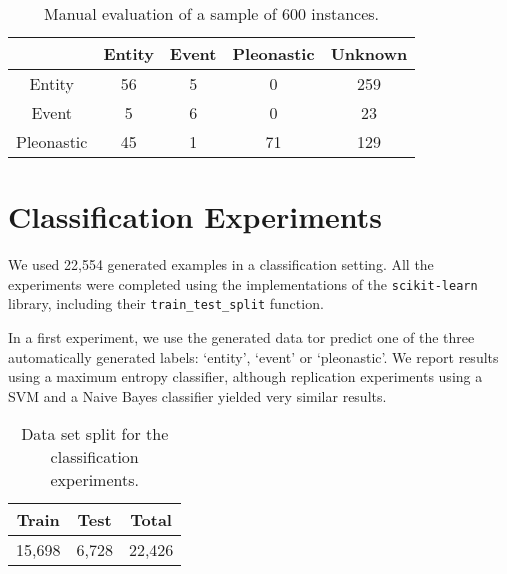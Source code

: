 \documentclass[10pt, a4paper]{article} \usepackage{lrec} \usepackage{multibib}
\begin{document}
\begin{table}[h!]\centering 
\begin{tabular}{ccccc} 
\toprule 
&Entity & Event &Pleonastic & Unknown \\ 
\midrule Entity &   56  &  5   &   0     &  259  \\ 
Event &    5  &  6   &  0  &  23\\ 
Pleonastic& 45 & 1&  71&  129\\
\bottomrule 
\end{tabular} \caption{Manual evaluation of a sample of 600
instances.}\label{tab:manualsample600} 
\end{table}




%
%
%
%
\section{Classification Experiments}

We used 22,554 generated examples in a classification setting. All the experiments were completed using the implementations of the \texttt{scikit-learn} library, including their \texttt{train\_test\_split} function. 

In a first experiment, we use the generated data tor predict one of the three automatically generated labels: `entity', `event' or `pleonastic'. We report results using a maximum entropy classifier, although replication experiments using a SVM and a Naive Bayes classifier yielded very similar results. 


\begin{table}[h!]\centering
\begin{tabular}{ccc}
\toprule
\textbf{Train} & \textbf{Test} & \textbf{Total} \\
\midrule
15,698 & 6,728 & 22,426 \\
\bottomrule
\end{tabular}
\caption{Data set split for the classification experiments. }
\end{table}
\end{document}
